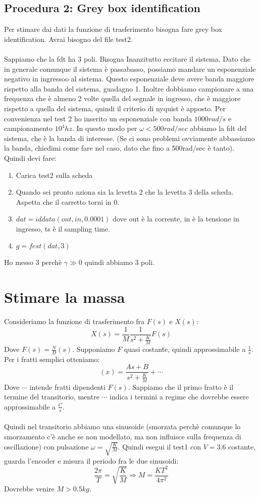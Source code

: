 \documentclass[10pt,a4paper]{article}
\begin{document}
\subsection{Procedura 2: Grey box identification}
Per stimare dai dati la funzione di trasferimento bisogna fare grey box identification. Avrai bisogno del file test2.\\ \\Sappiamo che la fdt ha 3 poli. Bisogna Inanzitutto eccitare il sistema. Dato che in generale comunque il sistema è passabasso, possiamo mandare un esponenziale negativo in ingressoo al sistema. Questo esponenziale deve avere banda maggiore rispetto alla banda del sistema, guadagno 1. Inoltre dobbiamo campionare a una frequenza che è almeno 2 volte quella del segnale in ingresso, che è maggiore rispetto a quella del sistema, quindi il criterio di nyquist è apposto. Per convenienza nel test 2 ho inserito un esponenziale con banda $1000rad/s$ e campionamento $10^4 hz$. In questo modo per $\omega < 500 rad/sec$ abbiamo la fdt del sistema, che è la banda di interesse. (Se ci sono problemi ovviamente abbassiamo la banda, chiedimi come fare nel caso, dato che fino a 500rad/sec è tanto). \\
Quindi devi fare:
\begin{enumerate}
\item Carica test2 sulla scheda
\item Quando sei pronto aziona sia la levetta 2 che la levetta 3 della scheda. Aspetta che il carretto torni in 0.
\item $dat = iddata(out,in, 0.0001)$ dove out è la corrente, in è la tensione in ingresso, ts è il sampling time.
\item $g = fest(dat, 3)$
\end{enumerate}
Ho messo $3$ perchè $\gamma \gg 0$ quindi abbiamo $3$ poli.
\section{Stimare la massa}
Consideriamo la funzione di trasferimento fra $F(s)$ e $X(s)$:
$$X(s)= \frac{1}{M}\frac{1}{s^2+\frac{K}{M}}F(s)$$
Dove $F(s) = \frac{N}{D}(s)$. Supponiamo $F$ quasi costante, quindi approssimabile a $\frac{1}{s}$. Per i fratti semplici otteniamo:
$$(x) = \frac{As+B}{s^2+\frac{K}{M}}+\cdots$$
Dove $\cdots$ intende fratti dipendenti $F(s)$. Sappiamo che il primo fratto è il termine del transitorio, mentre $\cdots$  indica i termini a regime che dovrebbe essere approssimabile a $\frac{C}{s}$. \\ \\
Quindi nel transitorio abbiamo una sinusoide (smorzata perchè comunque lo smorzamento c'è anche se non modellato, ma non influisce sulla frequenza di oscillazione) con pulsazione $\omega = \sqrt{\frac{K}{M}}$. Quindi esegui il test1 con $V=3.6$ costante, guarda l'encoder e misura il periodo fra le due sinusoidi:
$$\frac{2\pi}{T}= \sqrt{\frac{K}{M}} \Rightarrow M = \frac{KT^2}{4\pi^2}$$
Dovrebbe venire $M > 0.5kg$.
\end{document}
